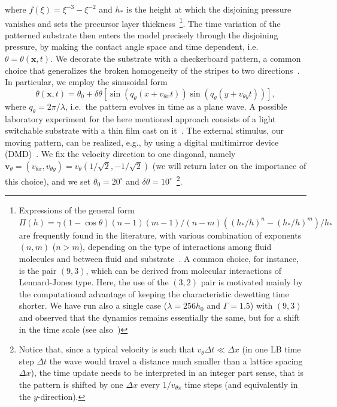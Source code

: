 where $f(\xi)=\xi^{-3} - \xi^{-2}$ and $h_{\ast}$ is the height at which the disjoining pressure vanishes and sets the precursor layer thickness~\footnote{Expressions of the general form $\Pi(h) = \gamma(1-\cos \theta)(n-1)(m-1)/(n-m)((h_{\ast}/h)^n - (h_{\ast}/h)^m)/h_{\ast}$ are frequently found in the literature, with various combination of exponents $(n,m)$ ($n>m$), depending on the type of interactions among fluid molecules and between fluid and substrate~\cite{schwartzSimulationDropletMotion1998,mitlinDewettingSolidSurface1993,teletzkeHowLiquidsSpread1987}. 
A common choice, for instance, is the pair $(9,3)$, which can be derived from molecular interactions of Lennard-Jones type. 
Here, the use of the $(3,2)$ pair is motivated mainly by the computational advantage of keeping the characteristic dewetting time shorter. 
We have run also a single case ($\lambda=256 h_0$ and $\Gamma=1.5$) with $(9,3)$ and observed that the dynamics remains essentially the same, but for a shift in the time scale (see also~\cite{zitzLatticeBoltzmannSimulations2021})}.
The time variation of the patterned substrate then enters the model precisely through the disjoining pressure, by making the contact angle space and time dependent, i.e. $\theta = \theta(\mathbf{x},t)$.
We decorate the substrate with a checkerboard pattern, a common choice that generalizes the broken homogeneity of the stripes to two directions~\cite{karguptaMesopatterningThinLiquid2003,jalaliFabricationCharacterizationScalable2018,nagayamaIntermediateWettingState2020,dasSurfacedirectedSpinodalDecomposition2020}.
In particular, we employ the sinusoidal form
\begin{equation}\label{eq:sinetheta}
   \!\! \theta(\mathbf{x},t) = \theta_0 + \delta\theta\left[\sin\left(q_{\theta} (x+v_{\theta x}t)\right)\sin\left(q_{\theta}(y+v_{\theta y}t)\right)\right],\! 
\end{equation}
where $q_{\theta} = 2\pi/\lambda$, i.e.~the pattern evolves in time as a plane wave.
A possible laboratory experiment for the here mentioned approach consists of a light switchable substrate with a thin film cast on it~\cite{beckerComplexDewettingScenarios2003, ichimuraLightDrivenMotionLiquids2000}. 
The external stimulus, our moving pattern, can be realized, e.g., by using a digital multimirror device (DMD)~\cite{vieyrasalasActiveControlEvaporative2012,sahaScalableSubmicrometerAdditive2019}.
We fix the velocity direction to one diagonal, namely $\mathbf{v}_{\theta} = (v_{\theta x},v_{\theta y}) = v_{\theta}(1/\sqrt{2},-1/\sqrt{2})$ (we will return later on the importance of this choice), and we set $\theta_0 = 20^{\circ}$ and $\delta\theta=10^{\circ}$~\footnote{Notice that, since a typical velocity is such that $v_{\theta} \Delta t \ll \Delta x$ (in one LB time step $\Delta t$ the wave would travel a distance much smaller than a lattice spacing $\Delta x$), the time update needs to be interpreted in an integer part sense, that is the pattern is shifted by one $\Delta x$ every $1/v_{\theta x}$ time steps (and equivalently in the $y$-direction).}.
